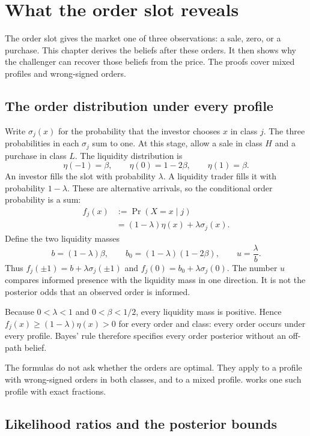 \section{What the order slot reveals}
\label{sec:04_slot_beliefs}

The order slot gives the market one of three observations: a sale, zero, or a purchase.
This chapter derives the beliefs after these orders.
It then shows why the challenger can recover those beliefs from the price.
The proofs cover mixed profiles and wrong-signed orders. 

\subsection{The order distribution under every profile}
\label{sec:04_slot_beliefs-law}

Write $\sigma_j(x)$ for the probability that the investor chooses $x$ in class $j$.
The three probabilities in each $\sigma_j$ sum to one.
At this stage, allow a sale in class $H$ and a purchase in class $L$.
The liquidity distribution is
\[
\eta(-1)=\beta,\qquad \eta(0)=1-2\beta,\qquad \eta(1)=\beta.
\]
An investor fills the slot with probability $\lambda$.
A liquidity trader fills it with probability $1-\lambda$.
These are alternative arrivals, so the conditional order probability is a sum:
\begin{align*}
f_j(x)&:=\Pr(X=x\mid j)\\
      &=(1-\lambda)\eta(x)+\lambda\sigma_j(x).
\end{align*}
Define the two liquidity masses
\[
b=(1-\lambda)\beta,\qquad b_0=(1-\lambda)(1-2\beta),\qquad u=\frac{\lambda}{b}.
\]
Thus $f_j(\pm1)=b+\lambda\sigma_j(\pm1)$ and $f_j(0)=b_0+\lambda\sigma_j(0)$.
The number $u$ compares informed presence with the liquidity mass in one direction.
It is not the posterior odds that an observed order is informed.

Because $0<\lambda<1$ and $0<\beta<1/2$, every liquidity mass is positive.
Hence $f_j(x)\ge (1-\lambda)\eta(x)>0$ for every order and class: every order occurs under every profile.
Bayes' rule therefore specifies every order posterior without an off-path belief.

The formulas do not ask whether the orders are optimal.
They apply to a profile with wrong-signed orders in both classes, and to a mixed profile.
 works one such profile with exact fractions.

\subsection{Likelihood ratios and the posterior bounds}
\label{sec:04_slot_beliefs-bounds}

